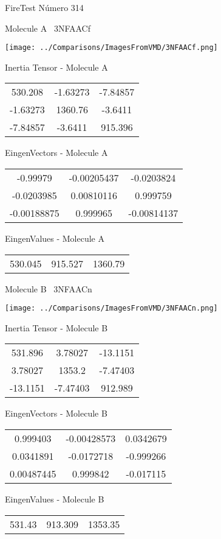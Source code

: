 \vtab[-3cm]
\begin{center}
{\large FireTest \tab Número 314}
\end{center}
\begin{multicols}{2}
\begin{center}

Molecule A \
3NFAACf

\texttt{[image: ../Comparisons/ImagesFromVMD/3NFAACf.png]}

Inertia Tensor - Molecule A \\
\begin{tabular}{|c c c|}
530.208	 & 	-1.63273	 & 	-7.84857	 \\
-1.63273	 & 	1360.76	 & 	-3.6411	 \\
-7.84857	 & 	-3.6411	 & 	915.396
\end{tabular}

\vtab
 EingenVectors - Molecule A     \\
\begin{tabular}{|c c c|}
-0.99979	 & 	-0.00205437	 & 	-0.0203824	 \\
-0.0203985	 & 	0.00810116	 & 	0.999759	 \\
-0.00188875	 & 	0.999965	 & 	-0.00814137
\end{tabular}

\vtab
 EingenValues - Molecule A     \\
\begin{tabular}{|c c c|}
530.045	 & 	915.527	 & 	1360.79	 \\
\end{tabular}
\columnbreak

Molecule B \
3NFAACn

\texttt{[image: ../Comparisons/ImagesFromVMD/3NFAACn.png]}

Inertia Tensor - Molecule B \\
\begin{tabular}{|c c c|}
531.896	 & 	3.78027	 & 	-13.1151	 \\
3.78027	 & 	1353.2	 & 	-7.47403	 \\
-13.1151	 & 	-7.47403	 & 	912.989
\end{tabular}

\vtab
 EingenVectors - Molecule B     \\
\begin{tabular}{|c c c|}
0.999403	 & 	-0.00428573	 & 	0.0342679	 \\
0.0341891	 & 	-0.0172718	 & 	-0.999266	 \\
0.00487445	 & 	0.999842	 & 	-0.017115
\end{tabular}

\vtab
 EingenValues - Molecule B     \\
\begin{tabular}{|c c c|}
531.43	 & 	913.309	 & 	1353.35	 \\
\end{tabular}

\end{center}
\end{multicols}

